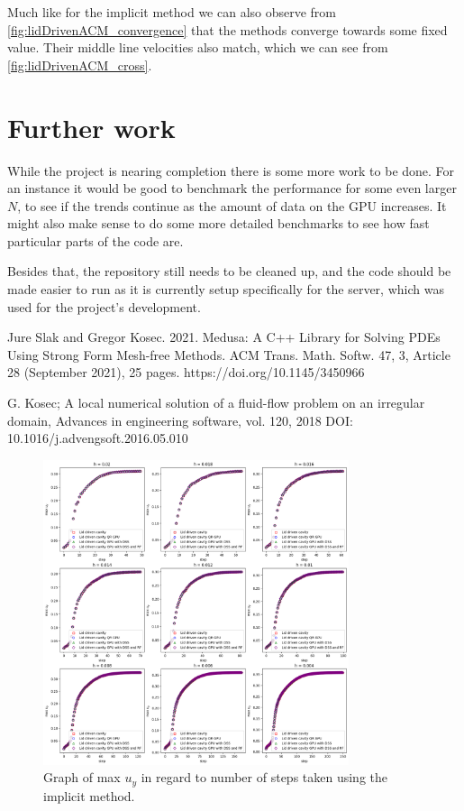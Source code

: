 \documentclass{article}
\begin{document}
Much like for the implicit method we can also observe from \ref{fig:lidDrivenACM_convergence} that 
the methods converge towards some fixed value. Their middle line velocities also match, which we can 
see from \ref{fig:lidDrivenACM_cross}.

\section{Further work}
While the project is nearing completion there is some more work to be done. For an instance it 
would be good to benchmark the performance for some even larger \(N\), to see if the trends continue
as the amount of data on the GPU increases. It might also make sense to do some more detailed 
benchmarks to see how fast particular parts of the code are.

Besides that, the repository still needs to be cleaned up, and the code should be made easier to run
as it is currently setup specifically for the server, which was used for the project's development. 
\begin{thebibliography}{99}
     Jure Slak and Gregor Kosec. 2021. Medusa: A C++ Library
    for Solving PDEs Using Strong Form Mesh-free Methods. ACM Trans. Math. Softw. 47,
    3, Article 28 (September 2021), 25 pages. https://doi.org/10.1145/3450966

     G. Kosec; A local numerical solution of a fluid-flow problem
    on an irregular domain, Advances in engineering software, vol. 120, 2018
    DOI: 10.1016/j.advengsoft.2016.05.010
\end{thebibliography}
\begin{figure}[h!] 
    \centering 
    \includegraphics[width=0.8\textwidth]{plots/lidDriven_convergence.png} 
    \caption{Graph of max $u_y$ in regard to number of steps taken using the implicit method.} 
    \label{fig:lidDriven_convergence} 
\end{figure}
\end{document}
